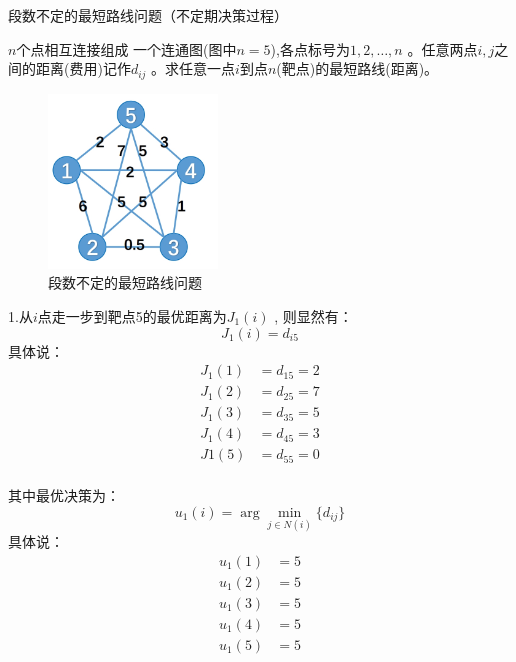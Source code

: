 \begin{example}

    段数不定的最短路线问题（不定期决策过程）

    $n$个点相互连接组成 一个连通图(图中$n=5$),各点标号为$1,2,…, n$ 。任意两点$i,j$之间的距离(费用)记作$d_{ij}$ 。求任意一点$i$到点$n$(靶点)的最短路线(距离)。

    \begin{figure}[ht]
        \centering
        \includegraphics[width=0.4\textwidth]{pic/1.2.3.png}
        \caption{段数不定的最短路线问题}
    \end{figure}

    1.从$i$点走一步到靶点5的最优距离为$J_1(i)$ , 则显然有：
    \begin{equation}
        J_1(i)=d_{i5}
    \end{equation}
    具体说：
    \begin{equation}
        \begin{aligned}
            J_1(1) & = d_{15} = 2 \\
            J_1(2) & = d_{25} = 7 \\
            J_1(3) & = d_{35} = 5 \\
            J_1(4) & = d_{45} = 3 \\
            J1(5)  & = d_{55} = 0 \\
        \end{aligned}
    \end{equation}

    其中最优决策为：
    \begin{equation}
        u_1(i)=\arg \min_{j\in N(i)}\{d_{ij}\}
    \end{equation}
    具体说：
    \begin{equation}
        \begin{aligned}
            u_1(1) & = 5 \\
            u_1(2) & = 5 \\
            u_1(3) & = 5 \\
            u_1(4) & = 5 \\
            u_1(5) & = 5 \\
        \end{aligned}
    \end{equation}


\end{example}
